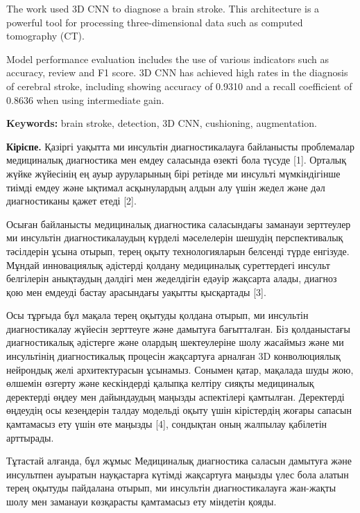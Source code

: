 The work used 3D CNN to diagnose a brain stroke. This architecture is a
powerful tool for processing three-dimensional data such as computed
tomography (CT).

Model performance evaluation includes the use of various indicators such
as accuracy, review and F1 score. 3D CNN has achieved high rates in the
diagnosis of cerebral stroke, including showing accuracy of 0.9310 and a
recall coefficient of 0.8636 when using intermediate gain.

{\bfseries Keywords:} brain stroke, detection, 3D CNN, cushioning,
augmentation.

\begin{multicols}{2}
{\bfseries Кіріспе.} Қазіргі уақытта ми инсультін диагностикалауға
байланысты проблемалар медициналық диагностика мен емдеу саласында
өзекті бола түсуде {[}1{]}. Орталық жүйке жүйесінің ең ауыр ауруларының
бірі ретінде ми инсульті мүмкіндігінше тиімді емдеу және ықтимал
асқынулардың алдын алу үшін жедел және дәл диагностиканы қажет етеді
{[}2{]}.

Осыған байланысты медициналық диагностика саласындағы заманауи
зерттеулер ми инсультін диагностикалаудың күрделі мәселелерін шешудің
перспективалық тәсілдерін ұсына отырып, терең оқыту технологияларын
белсенді түрде енгізуде. Мұндай инновациялық әдістерді қолдану
медициналық суреттердегі инсульт белгілерін анықтаудың дәлдігі мен
жеделдігін едәуір жақсарта алады, диагноз қою мен емдеуді бастау
арасындағы уақытты қысқартады {[}3{]}.

Осы тұрғыда бұл мақала терең оқытуды қолдана отырып, ми инсультін
диагностикалау жүйесін зерттеуге және дамытуға бағытталған. Біз
қолданыстағы диагностикалық әдістерге және олардың шектеулеріне шолу
жасаймыз және ми инсультінің диагностикалық процесін жақсартуға арналған
3D конволюциялық нейрондық желі архитектурасын ұсынамыз. Сонымен қатар,
мақалада шуды жою, өлшемін өзгерту және кескіндерді қалыпқа келтіру
сияқты медициналық деректерді өңдеу мен дайындаудың маңызды аспектілері
қамтылған. Деректерді өңдеудің осы кезеңдерін талдау модельді оқыту үшін
кірістердің жоғары сапасын қамтамасыз ету үшін өте маңызды {[}4{]},
сондықтан оның жалпылау қабілетін арттырады.

Тұтастай алғанда, бұл жұмыс Медициналық диагностика саласын дамытуға
және инсультпен ауыратын науқастарға күтімді жақсартуға маңызды үлес
бола алатын терең оқытуды пайдалана отырып, ми инсультін
диагностикалауға жан-жақты шолу мен заманауи көзқарасты қамтамасыз ету
міндетін қояды.


\end{multicols}
